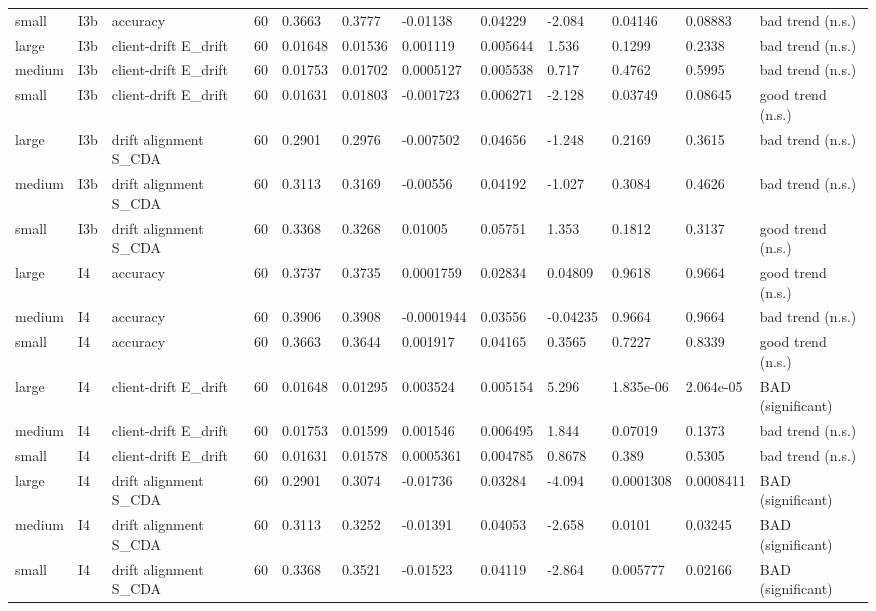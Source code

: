\begin{table}[t]
\begin{tabular}{llllllllllll}
small & I3b & accuracy & 60 & 0.3663 & 0.3777 & -0.01138 & 0.04229 & -2.084 & 0.04146 & 0.08883 & bad trend (n.s.) \\
large & I3b & client-drift E\_drift & 60 & 0.01648 & 0.01536 & 0.001119 & 0.005644 & 1.536 & 0.1299 & 0.2338 & bad trend (n.s.) \\
medium & I3b & client-drift E\_drift & 60 & 0.01753 & 0.01702 & 0.0005127 & 0.005538 & 0.717 & 0.4762 & 0.5995 & bad trend (n.s.) \\
small & I3b & client-drift E\_drift & 60 & 0.01631 & 0.01803 & -0.001723 & 0.006271 & -2.128 & 0.03749 & 0.08645 & good trend (n.s.) \\
large & I3b & drift alignment S\_CDA & 60 & 0.2901 & 0.2976 & -0.007502 & 0.04656 & -1.248 & 0.2169 & 0.3615 & bad trend (n.s.) \\
medium & I3b & drift alignment S\_CDA & 60 & 0.3113 & 0.3169 & -0.00556 & 0.04192 & -1.027 & 0.3084 & 0.4626 & bad trend (n.s.) \\
small & I3b & drift alignment S\_CDA & 60 & 0.3368 & 0.3268 & 0.01005 & 0.05751 & 1.353 & 0.1812 & 0.3137 & good trend (n.s.) \\
large & I4 & accuracy & 60 & 0.3737 & 0.3735 & 0.0001759 & 0.02834 & 0.04809 & 0.9618 & 0.9664 & good trend (n.s.) \\
medium & I4 & accuracy & 60 & 0.3906 & 0.3908 & -0.0001944 & 0.03556 & -0.04235 & 0.9664 & 0.9664 & bad trend (n.s.) \\
small & I4 & accuracy & 60 & 0.3663 & 0.3644 & 0.001917 & 0.04165 & 0.3565 & 0.7227 & 0.8339 & good trend (n.s.) \\
large & I4 & client-drift E\_drift & 60 & 0.01648 & 0.01295 & 0.003524 & 0.005154 & 5.296 & 1.835e-06 & 2.064e-05 & BAD (significant) \\
medium & I4 & client-drift E\_drift & 60 & 0.01753 & 0.01599 & 0.001546 & 0.006495 & 1.844 & 0.07019 & 0.1373 & bad trend (n.s.) \\
small & I4 & client-drift E\_drift & 60 & 0.01631 & 0.01578 & 0.0005361 & 0.004785 & 0.8678 & 0.389 & 0.5305 & bad trend (n.s.) \\
large & I4 & drift alignment S\_CDA & 60 & 0.2901 & 0.3074 & -0.01736 & 0.03284 & -4.094 & 0.0001308 & 0.0008411 & BAD (significant) \\
medium & I4 & drift alignment S\_CDA & 60 & 0.3113 & 0.3252 & -0.01391 & 0.04053 & -2.658 & 0.0101 & 0.03245 & BAD (significant) \\
small & I4 & drift alignment S\_CDA & 60 & 0.3368 & 0.3521 & -0.01523 & 0.04119 & -2.864 & 0.005777 & 0.02166 & BAD (significant) \\
\bottomrule
\end{tabular}
\end{table}